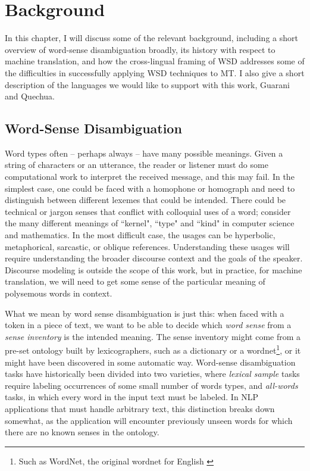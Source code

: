 \chapter{Background}
\label{chap:background}

In this chapter, I will discuss some of the relevant background, including a
short overview of word-sense disambiguation broadly, its history with respect
to machine translation, and how the cross-lingual framing of WSD addresses some
of the difficulties in successfully applying WSD techniques to MT. I also give
a short description of the languages we would like to support with this work,
Guarani and Quechua.

\section{Word-Sense Disambiguation}
\label{sec:background-wsd}
Word types often -- perhaps always -- have many possible meanings. Given a
string of characters or an utterance, the reader or listener must do some
computational work to interpret the received message, and this may fail.
In the simplest case, one could be faced with
a homophone or homograph and need to distinguish between different lexemes that
could be intended. There could be technical or jargon senses that conflict with
colloquial uses of a word; consider the many different meanings of ``kernel",
``type" and ``kind" in computer science and mathematics. In the most difficult
case, the usages can be hyperbolic, metaphorical, sarcastic, or oblique
references. Understanding these usages will require understanding the broader
discourse context and the goals of the speaker. Discourse modeling is outside
the scope of this work, but in practice, for machine translation, we will need
to get some sense of the particular meaning of polysemous words in context.

What we mean by word sense disambiguation is just this:
when faced with a token in a piece of text, we want to be able to
decide which \emph{word sense} from a \emph{sense inventory} is the intended
meaning. The sense inventory might come from a pre-set ontology built by
lexicographers, such as a
dictionary or a wordnet\footnote{Such as WordNet\textregistered, 
the original wordnet for English \cite{DBLP:journals/cacm/Miller95}}, or it
might have been discovered in some automatic
way. Word-sense disambiguation tasks have historically been divided into two
varieties, where \emph{lexical sample} tasks require labeling occurrences of
some small number of words types, and \emph{all-words} tasks, in which every
word in the input text must be labeled\cite{agirre2006word}. In NLP
applications that must handle arbitrary text, this distinction breaks down
somewhat, as the application will encounter previously unseen words for which
there are no known senses in the ontology.


